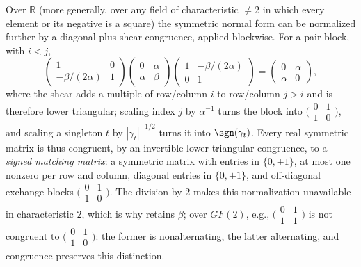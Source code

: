 \begin{remark}\label{rem:signed}
  Over $\mathbb{R}$ (more generally, over any field of characteristic
  $\neq 2$ in which every element or its negative is a square) the
  symmetric normal form can be normalized further by a diagonal-plus-shear
  congruence, applied blockwise.  For a pair block, with $i < j$,
  \[
    \begin{pmatrix}
      1 & 0\\
      -\beta/(2\alpha) & 1
    \end{pmatrix}
    \begin{pmatrix}
      0 & \alpha\\
      \alpha & \beta
    \end{pmatrix}
    \begin{pmatrix}
      1 & -\beta/(2\alpha)\\
      0 & 1
    \end{pmatrix}
    =
    \begin{pmatrix}
      0 & \alpha\\
      \alpha & 0
    \end{pmatrix},
  \]
  where the shear adds a multiple of row/column $i$ to row/column $j > i$
  and is therefore lower triangular; scaling index $j$ by $\alpha^{-1}$
  turns the block into
  $\bigl(\begin{smallmatrix} 0 & 1\\ 1 & 0 \end{smallmatrix}\bigr)$, and
  scaling a singleton $t$ by $|\gamma_t|^{-1/2}$ turns it into
  $\sgn(\gamma_t)$.  Every real symmetric matrix is thus congruent, by an
  invertible lower triangular congruence, to a \emph{signed matching
  matrix}: a symmetric matrix with entries in $\{0, \pm 1\}$, at most one
  nonzero per row and column, diagonal entries in $\{0, \pm 1\}$, and
  off-diagonal exchange blocks
  $\bigl(\begin{smallmatrix} 0 & 1\\ 1 & 0 \end{smallmatrix}\bigr)$.  The
  division by $2$ makes this normalization unavailable in characteristic
  $2$, which is why  retains $\beta$; over
  $GF(2)$, e.g., $\bigl(\begin{smallmatrix} 0 & 1\\ 1 & 1
  \end{smallmatrix}\bigr)$ is not congruent to
  $\bigl(\begin{smallmatrix} 0 & 1\\ 1 & 0 \end{smallmatrix}\bigr)$: the
  former is nonalternating, the latter alternating, and congruence
  preserves this distinction.
\end{remark}

